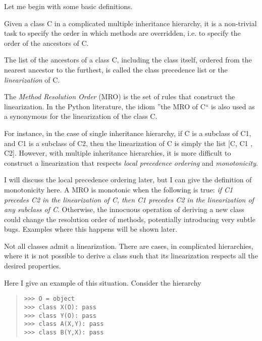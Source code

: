 \documentclass[10pt,english]{article}
\begin{document}
Let me begin with some basic definitions.
\begin{list}{)}
{
\setlength{\rightmargin}{\leftmargin}
}
\item {} 
Given a class C in a complicated multiple inheritance hierarchy, it
is a non-trivial task to specify the order in which methods are
overridden, i.e. to specify the order of the ancestors of C.

\item {} 
The list of the ancestors of a class C, including the class itself,
ordered from the nearest ancestor to the furthest, is called the
class precedence list or the \emph{linearization} of C.

\item {} 
The \emph{Method Resolution Order} (MRO) is the set of rules that
construct the linearization.  In the Python literature, the idiom
''the MRO of C`` is also used as a synonymous for the linearization of
the class C.

\item {} 
For instance, in the case of single inheritance hierarchy, if C is a
subclass of C1, and C1 is a subclass of C2, then the linearization of
C is simply the list [C, C1 , C2].  However, with multiple
inheritance hierarchies, it is more difficult to construct a
linearization that respects \emph{local precedence ordering} and
\emph{monotonicity}.

\item {} 
I will discuss the local precedence ordering later, but I can give
the definition of monotonicity here.  A MRO is monotonic when the
following is true:  \emph{if C1 precedes C2 in the linearization of C,
then C1 precedes C2 in the linearization of any subclass of C}.
Otherwise, the innocuous operation of deriving a new class could
change the resolution order of methods, potentially introducing very
subtle bugs.  Examples where this happens will be shown later.

\item {} 
Not all classes admit a linearization.  There are cases, in
complicated hierarchies, where it is not possible to derive a class
such that its linearization respects all the desired properties.

\end{list}

Here I give an example of this situation. Consider the hierarchy
\begin{quote}
\begin{verbatim}>>> O = object
>>> class X(O): pass
>>> class Y(O): pass
>>> class A(X,Y): pass
>>> class B(Y,X): pass\end{verbatim}
\end{quote}
\end{document}

